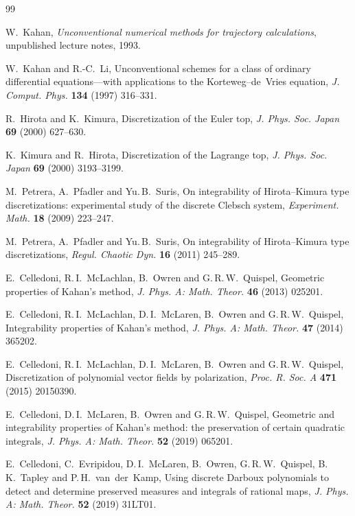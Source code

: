 \documentclass[11pt,a4paper]{article}
\theoremstyle{definition}
\theoremstyle{remark}
\begin{document}
\begin{thebibliography}{99}\small

 W.~Kahan, \emph{Unconventional numerical methods for trajectory calculations}, unpublished
lecture notes, 1993.

 W.~Kahan and R.-C.~Li, Unconventional schemes for a class of ordinary differential
equations---with applications to the Korteweg--de~Vries equation, \emph{J. Comput. Phys.} \textbf{134} (1997)
316--331.

 R.~Hirota and K.~Kimura, Discretization of the Euler top, \emph{J. Phys. Soc. Japan}
\textbf{69} (2000) 627--630.

 K.~Kimura and R.~Hirota, Discretization of the Lagrange top, \emph{J. Phys. Soc.
Japan} \textbf{69} (2000) 3193--3199.

 M.~Petrera, A.~Pfadler and Yu.\,B.~Suris, On integrability of Hirota--Kimura type
discretizations: experimental study of the discrete Clebsch system, \emph{Experiment. Math.} \textbf{18} (2009)
223--247.

 M.~Petrera, A.~Pfadler and Yu.\,B.~Suris, On integrability of Hirota--Kimura type
discretizations, \emph{Regul. Chaotic Dyn.} \textbf{16} (2011) 245--289.

 E.~Celledoni, R.\,I.~McLachlan, B.~Owren and G.\,R.\,W.~Quispel, Geometric properties of
Kahan's method, \emph{J. Phys. A: Math. Theor.} \textbf{46} (2013) 025201.

 E.~Celledoni, R.\,I.~McLachlan, D.\,I.~McLaren, B.~Owren and G.\,R.\,W.~Quispel, Integrability
properties of Kahan's method, \emph{J. Phys. A: Math. Theor.} \textbf{47} (2014) 365202.

 E.~Celledoni, R.\,I.~McLachlan, D.\,I.~McLaren, B.~Owren and G.\,R.\,W.~Quispel,
Discretization of polynomial vector fields by polarization, \emph{Proc. R. Soc. A} \textbf{471} (2015)
20150390.

 E.~Celledoni, D.\,I.~McLaren, B.~Owren and G.\,R.\,W.~Quispel, Geometric and integrability
properties of Kahan's method: the preservation of certain quadratic integrals, \emph{J. Phys. A: Math. Theor.}
\textbf{52} (2019) 065201.

 E.~Celledoni, C.~Evripidou, D.\,I.~McLaren, B.~Owren, G.\,R.\,W.~Quispel, B.\,K.~Tapley
and P.\,H.~van~der~Kamp, Using discrete Darboux polynomials to detect and determine preserved measures and
integrals of rational maps, \emph{J. Phys. A: Math. Theor.} \textbf{52} (2019) 31LT01.


\end{thebibliography}
\end{document}
